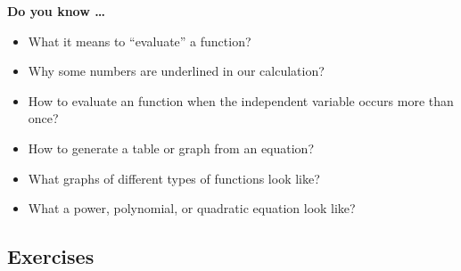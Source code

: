 
 
 
\noindent \textbf{Do you know \ldots}

\begin{itemize}
\item What it means to ``evaluate'' a function? 
\item Why some numbers are underlined in our calculation?
\item How to evaluate an function when the independent variable occurs more than once? 
\item How to generate a table or graph from an equation? 
\item What graphs of different types of functions look like? 
\item What a power, polynomial, or quadratic equation look like?
 
\end{itemize} 

\subsection*{Exercises}

